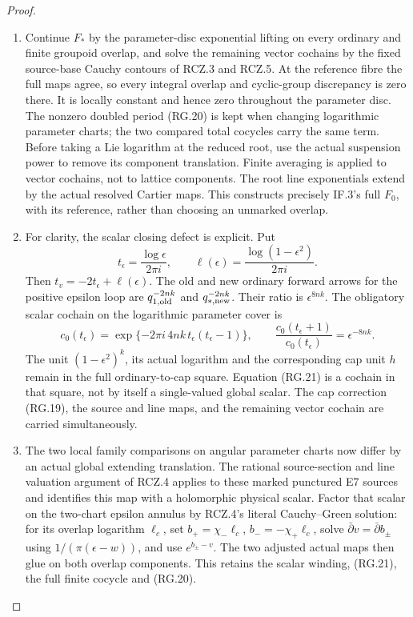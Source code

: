 \begin{proof}
\begin{enumerate}[label=\arabic*.]
\item Continue \(F_*\) by the parameter-disc exponential lifting
on every ordinary and finite groupoid overlap, and solve the
remaining vector cochains by the fixed source-base Cauchy
contours of RCZ.3 and RCZ.5. At the reference fibre the full
maps agree, so every integral overlap and cyclic-group
discrepancy is zero there. It is locally constant and hence
zero throughout the parameter disc. The nonzero doubled
period (RG.20) is kept when changing logarithmic parameter
charts; the two compared total cocycles carry the same
term. Before taking a Lie logarithm at the reduced root,
use the actual suspension power to remove its component
translation. Finite averaging is applied to vector
cochains, not to lattice components. The root line
exponentials extend by the actual resolved Cartier maps.
This constructs precisely IF.3's full \(F_0\), with its
reference, rather than choosing an unmarked overlap.

\item For clarity, the scalar closing defect is explicit. Put
\[
 t_\epsilon=\frac{\log\epsilon}{2\pi i},\qquad
 \ell(\epsilon)=\frac{\log(1-\epsilon^2)}{2\pi i}.
\]
Then \(t_v=-2t_\epsilon+\ell(\epsilon)\).
The old and new ordinary forward arrows for the positive
epsilon loop are \(q_{1,\rm old}^{-2nk}\) and
\(q_{*,\rm new}^{-2nk}\). Their ratio is
\(\epsilon^{8nk}\). The obligatory scalar cochain on the
logarithmic parameter cover is
\[
 c_0(t_\epsilon)=
       \exp\{-2\pi i\,4nk\,t_\epsilon(t_\epsilon-1)\},
 \qquad
 \frac{c_0(t_\epsilon+1)}{c_0(t_\epsilon)}
                              =\epsilon^{-8nk}.
                                                        \tag{RG.21}
\]
The unit \((1-\epsilon^2)^k\), its actual logarithm and
the corresponding cap unit \(h\) remain in the full
ordinary-to-cap square. Equation (RG.21) is a cochain in
that square, not by itself a single-valued global scalar.
The cap correction (RG.19), the source and line maps, and
the remaining vector cochain are carried simultaneously.

\item The two local family comparisons on angular parameter
charts now differ by an actual global extending
translation. The rational source-section and line
valuation argument of RCZ.4 applies to these marked
punctured E7 sources and identifies this map with a
holomorphic physical scalar. Factor that scalar on the
two-chart epsilon annulus by RCZ.4's literal
Cauchy--Green solution: for its overlap logarithm
\(\ell_c\), set \(b_+=\chi_-\ell_c\),
\(b_-=-\chi_+\ell_c\), solve
\(\bar\partial v=\bar\partial b_\pm\) using
\(1/(\pi(\epsilon-w))\), and use
\(e^{b_\pm-v}\). The two adjusted actual maps then glue
on both overlap components. This retains the scalar
winding, (RG.21), the full finite cocycle and (RG.20).


\end{enumerate}
\end{proof}

